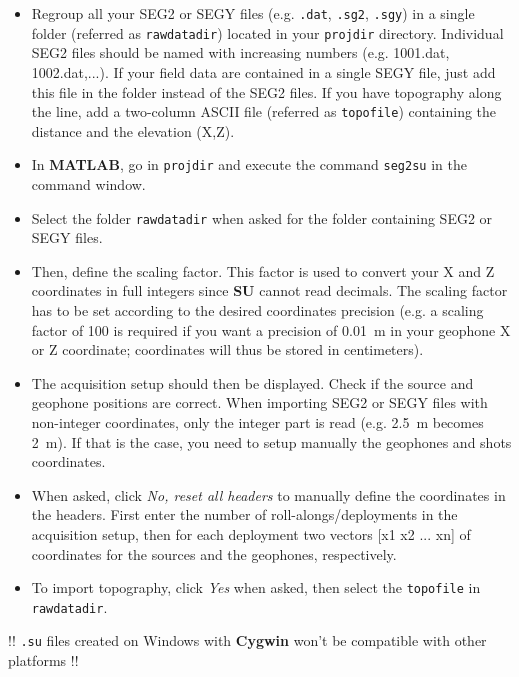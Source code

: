 \documentclass[twoside,a4paper]{article}
\def\SU{\textbf{SU}}
\def\MATLAB{\textbf{MATLAB}}
\def\Cygwin{\textbf{Cygwin}}
\begin{document}
\begin{itemize}[leftmargin=*]
\setlength\itemsep{2ex}
\item Regroup all your SEG2 or SEGY files (e.g. \verb|.dat|, \verb|.sg2|, \verb|.sgy|) in a single folder (referred as \verb|rawdatadir|) located in your \verb|projdir| directory. Individual SEG2 files should be named with increasing numbers (e.g. 1001.dat, 1002.dat,...). If your field data are contained in a single SEGY file, just add this file in the folder instead of the SEG2 files. If you have topography along the line, add a two-column ASCII file (referred as \verb|topofile|) containing the distance and the elevation (X,Z).
\item In {\MATLAB}, go in \verb|projdir| and execute the command \verb|seg2su| in the command window.
\item Select the folder \verb|rawdatadir| when asked for the folder containing SEG2 or SEGY files.
\item Then, define the scaling factor. This factor is used to convert your X and Z coordinates in full integers since {\SU} cannot read decimals. The scaling factor has to be set according to the desired coordinates precision (e.g. a scaling factor of 100 is required if you want a precision of 0.01~m in your geophone X or Z coordinate; coordinates will thus be stored in centimeters).
\item The acquisition setup should then be displayed. Check if the source and geophone positions are correct. When importing SEG2 or SEGY files with non-integer coordinates, only the integer part is read (e.g. 2.5~m becomes 2~m). If that is the case, you need to setup manually the geophones and shots coordinates.
\item When asked, click \textit{No, reset all headers} to manually define the coordinates in the headers. First enter the number of roll-alongs/deployments in the acquisition setup, then for each deployment two vectors [x1 x2 ... xn] of coordinates for the sources and the geophones, respectively.
\item To import topography, click \textit{Yes} when asked, then select the \verb|topofile| in \verb|rawdatadir|. 
\end{itemize}



!! \verb|.su| files created on Windows with {\Cygwin} won't be compatible with other platforms !!
\end{document}
